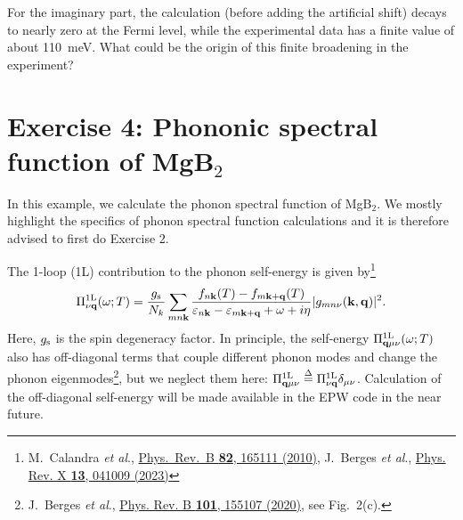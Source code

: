 \documentclass[a4paper,11pt,serif]{article}
\newcommand{\mb}[1]{\mathbf{#1}}
\newcommand{\nuq}[0]{{\nu\mb{q}}}
\begin{document}
\action For the imaginary part, the calculation (before adding the artificial shift) decays to nearly zero at the Fermi level, while the experimental data has a finite value of about 110~meV. What could be the origin of this finite broadening in the experiment?


\newpage

\section*{Exercise 4: Phononic spectral function of MgB$_2$}

In this example, we calculate the phonon spectral function of MgB$_2$.
We mostly highlight the specifics of phonon spectral function calculations and it is therefore advised to first do Exercise 2.

The 1-loop (1L) contribution to the phonon self-energy is given by\footnote{M.\ Calandra \textit{et al}., \href{https://journals.aps.org/prb/abstract/10.1103/PhysRevB.82.165111}{Phys.\ Rev.\ B \textbf{82}, 165111 (2010)}, J.\ Berges \textit{et al}., \href{https://journals.aps.org/prx/abstract/10.1103/PhysRevX.13.041009}{Phys. Rev. X \textbf{13}, 041009 (2023)}}
\begin{equation} \label{eq:phself}
   \Pi^{\rm 1L}_\nuq(\omega; T) = \frac{g_{\rm s}}{N_k} \sum_{mn\mb{k}} \frac{f_{n\mb{k}}(T) - f_{m\mb{k+q}}(T)}{\varepsilon_{n\mb{k}} - \varepsilon_{m\mb{k+q}} + \omega + i\eta} \lvert g_{mn\nu}(\mb{k}, \mb{q}) \rvert^2.
\end{equation}
Here, $g_{\rm s}$ is the spin degeneracy factor.
In principle, the self-energy $\Pi^{\rm 1L}_{\mb{q}\mu\nu}(\omega; T)$ also has off-diagonal terms that couple different phonon modes and change the phonon eigenmodes\footnote{J.\ Berges \textit{et al}., \href{https://journals.aps.org/prb/abstract/10.1103/PhysRevB.101.155107}{Phys. Rev. B \textbf{101}, 155107 (2020)}, see Fig.~2(c).}, but we neglect them here: $\Pi^{\rm 1L}_{\mb{q}\mu\nu} \stackrel{\Delta}{=} \Pi^{\rm 1L}_{\nu\mb{q}} \delta_{\mu \nu}$.
Calculation of the off-diagonal self-energy will be made available in the EPW code in the near future.

\vspace{0.2cm}
\end{document}

